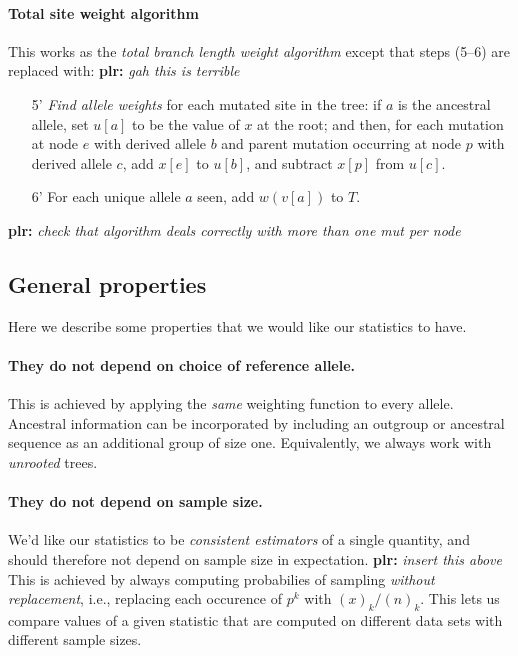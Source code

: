 \documentclass{article}
\newcommand{\plr}[1]{{\color{blue}\textbf{plr:} \it #1}}
\begin{document}
\paragraph{Total site weight algorithm}
This works as the \emph{total branch length weight algorithm} except that steps (5--6) are replaced with:
\plr{gah this is terrible}
\begin{itemize}
    \item[5'] \emph{Find allele weights} for each mutated site in the tree:
        if $a$ is the ancestral allele,
        set $u[a]$ to be the value of $x$ at the root; and then,
        for each mutation at node $e$ with derived allele $b$
        and parent mutation occurring at node $p$ with derived allele $c$,
        add $x[e]$ to $u[b]$, and subtract $x[p]$ from $u[c]$.
    \item[6'] For each unique allele $a$ seen,
        add $w(v[a])$ to $T$.
\end{itemize}
\plr{check that algorithm deals correctly with more than one mut per node}

\subsection*{General properties}

Here we describe some properties that we would like our statistics to have.

\paragraph{They do not depend on choice of reference allele.}
This is achieved by applying the \emph{same} weighting function to every allele.
Ancestral information can be incorporated by including an outgroup or ancestral sequence
as an additional group of size one.
Equivalently, we always work with \emph{unrooted} trees.

\paragraph{They do not depend on sample size.}
We'd like our statistics to be \emph{consistent estimators}
of a single quantity, and should therefore not depend on sample size in expectation.
\plr{insert this above}
This is achieved by always computing probabilies of sampling \emph{without replacement},
i.e., replacing each occurence of $p^k$ with $(x)_k/(n)_k$.
This lets us compare values of a given statistic
that are computed on different data sets with different sample sizes.
\end{document}
